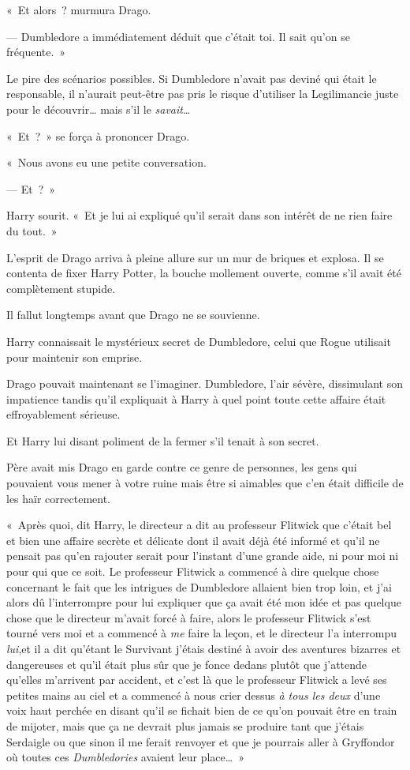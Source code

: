 «~Et alors~? murmura Drago.

--- Dumbledore a immédiatement déduit que c'était toi.
Il sait qu'on se fréquente.~»

Le pire des scénarios possibles.
Si Dumbledore n'avait pas deviné qui était le responsable, il n'aurait peut-être pas pris le risque d'utiliser la Legilimancie juste pour le découvrir… mais s'il le \emph{savait}…

«~Et~?~» se força à prononcer Drago.

«~Nous avons eu une petite conversation.

--- Et~?~»

Harry sourit.
«~Et je lui ai expliqué qu'il serait dans son intérêt de ne rien faire du tout.~»

L'esprit de Drago arriva à pleine allure sur un mur de briques et explosa.
Il se contenta de fixer Harry Potter, la bouche mollement ouverte, comme s'il avait été complètement stupide.

Il fallut longtemps avant que Drago ne se souvienne.

Harry connaissait le mystérieux secret de Dumbledore, celui que Rogue utilisait pour maintenir son emprise.

Drago pouvait maintenant se l'imaginer.
Dumbledore, l'air sévère, dissimulant son impatience tandis qu'il expliquait à Harry à quel point toute cette affaire était effroyablement sérieuse.

Et Harry lui disant poliment de la fermer s'il tenait à son secret.

Père avait mis Drago en garde contre ce genre de personnes, les gens qui pouvaient vous mener à votre ruine mais être si aimables que c'en était difficile de les haïr correctement.

«~Après quoi, dit Harry, le directeur a dit au professeur Flitwick que c'était bel et bien une affaire secrète et délicate dont il avait déjà été informé et qu'il ne pensait pas qu'en rajouter serait pour l'instant d'une grande aide, ni pour moi ni pour qui que ce soit.
Le professeur Flitwick a commencé à dire quelque chose concernant le fait que les intrigues de Dumbledore allaient bien trop loin, et j'ai alors dû l'interrompre pour lui expliquer que ça avait été mon idée et pas quelque chose que le directeur m'avait forcé à faire, alors le professeur Flitwick s'est tourné vers moi et a commencé à \emph{me} faire la leçon, et le directeur l'a interrompu \emph{lui},et il a dit qu'étant le Survivant j'étais destiné à avoir des aventures bizarres et dangereuses et qu'il était plus sûr que je fonce dedans plutôt que j'attende qu'elles m'arrivent par accident, et c'est là que le professeur Flitwick a levé ses petites mains au ciel et a commencé à nous crier dessus \emph{à tous les deux} d'une voix haut perchée en disant qu'il se fichait bien de ce qu'on pouvait être en train de mijoter, mais que ça ne devrait plus jamais se produire tant que j'étais Serdaigle ou que sinon il me ferait renvoyer et que je pourrais aller à Gryffondor où toutes ces \emph{Dumbledories} avaient leur place…~»

